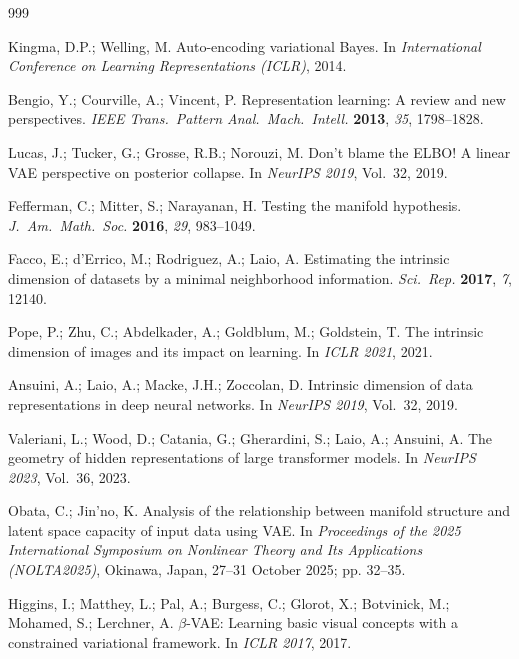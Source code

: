 \documentclass[make,article,submit,pdftex,moreauthors]{Definitions/mdpi}
\begin{document}

\begin{thebibliography}{999}

Kingma, D.P.; Welling, M.
Auto-encoding variational Bayes.
In \textit{International Conference on Learning Representations (ICLR)},
2014.

Bengio, Y.; Courville, A.; Vincent, P.
Representation learning: A review and new perspectives.
\textit{IEEE Trans.\ Pattern Anal.\ Mach.\ Intell.} \textbf{2013},
\textit{35}, 1798--1828.

Lucas, J.; Tucker, G.; Grosse, R.B.; Norouzi, M.
Don't blame the ELBO! A linear VAE perspective on posterior collapse.
In \textit{NeurIPS 2019}, Vol.~32, 2019.

Fefferman, C.; Mitter, S.; Narayanan, H.
Testing the manifold hypothesis.
\textit{J.\ Am.\ Math.\ Soc.} \textbf{2016}, \textit{29}, 983--1049.

Facco, E.; d'Errico, M.; Rodriguez, A.; Laio, A.
Estimating the intrinsic dimension of datasets by a minimal neighborhood
information.
\textit{Sci.\ Rep.} \textbf{2017}, \textit{7}, 12140.

Pope, P.; Zhu, C.; Abdelkader, A.; Goldblum, M.; Goldstein, T.
The intrinsic dimension of images and its impact on learning.
In \textit{ICLR 2021}, 2021.

Ansuini, A.; Laio, A.; Macke, J.H.; Zoccolan, D.
Intrinsic dimension of data representations in deep neural networks.
In \textit{NeurIPS 2019}, Vol.~32, 2019.

Valeriani, L.; Wood, D.; Catania, G.; Gherardini, S.; Laio, A.; Ansuini, A.
The geometry of hidden representations of large transformer models.
In \textit{NeurIPS 2023}, Vol.~36, 2023.

Obata, C.; Jin'no, K.
Analysis of the relationship between manifold structure and latent space
capacity of input data using VAE.
In \textit{Proceedings of the 2025 International Symposium on Nonlinear
Theory and Its Applications (NOLTA2025)}, Okinawa, Japan, 27--31 October
2025; pp. 32--35.

Higgins, I.; Matthey, L.; Pal, A.; Burgess, C.; Glorot, X.; Botvinick, M.;
Mohamed, S.; Lerchner, A.
$\beta$-VAE: Learning basic visual concepts with a constrained variational
framework.
In \textit{ICLR 2017}, 2017.


\end{thebibliography}
\end{document}
